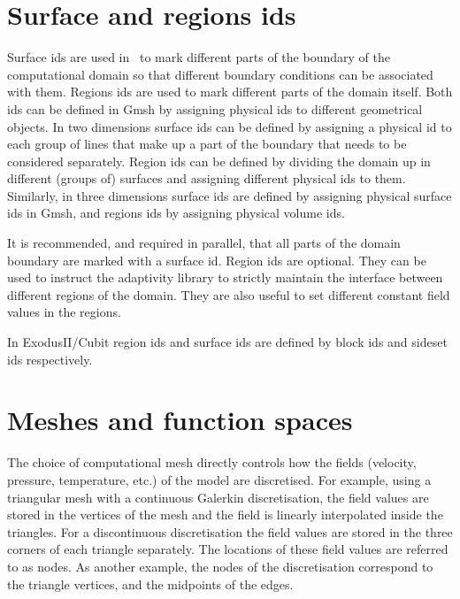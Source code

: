 \section{Surface and regions ids}
\label{sec:surface_and_region_ids}
Surface ids are used in \fluidity\ to mark different parts of the boundary of the
computational domain so that different boundary conditions can be associated
with them. Regions ids are used to mark different parts of the domain itself.
Both ids can be defined in Gmsh by assigning physical ids to different
geometrical objects. In two dimensions surface ids can be defined by assigning a
physical id to each group of lines that make up a part of the boundary that
needs to be considered separately. Region ids can be defined by dividing the
domain up in different (groups of) surfaces and assigning different 
physical ids to them. Similarly, in three dimensions surface ids are defined by
assigning physical surface ids in Gmsh, and regions ids by assigning physical
volume ids.

It is recommended, and required in parallel, that all parts of the domain
boundary are marked with a surface id. Region ids are optional. They can be used
to instruct the adaptivity library to strictly maintain the interface between 
different regions of the domain. They are also useful to set different constant 
field values in the regions.

In ExodusII/Cubit region ids and surface ids are defined by block ids and 
sideset ids respectively. 

\section{Meshes and function spaces}
\label{sec:meshes_and_function_spaces}
The choice of computational mesh directly controls how the fields (velocity,
pressure, temperature, etc.) of the model are discretised. For example, using a
triangular mesh with a \Pone continuous Galerkin discretisation, the field
values are stored in the vertices of the mesh and the field is linearly
interpolated inside the triangles. For a discontinuous \PoDG discretisation the
field values are stored in the three corners of each triangle separately. The
locations of these field values are referred to as nodes. As another example, the
nodes of the \Ptwo discretisation correspond to the triangle vertices, and the
midpoints of the edges.

